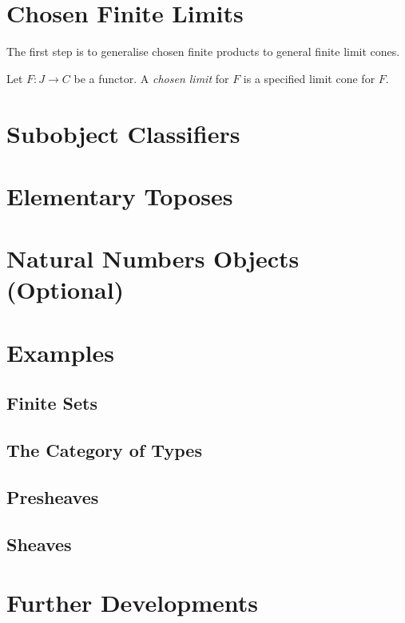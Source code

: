\section{Chosen Finite Limits}

The first step is to generalise chosen finite products to general finite limit cones.

\begin{definition}
\label{def:chosen_limit}
Let $F : J \to C$ be a functor. A \emph{chosen limit} for $F$ is a specified limit cone for $F$.
\end{definition}

\section{Subobject Classifiers}
\section{Elementary Toposes}
\section{Natural Numbers Objects (Optional)}
\section{Examples}
\subsection{Finite Sets}
\subsection{The Category of Types}
\subsection{Presheaves}
\subsection{Sheaves}
\section{Further Developments}
